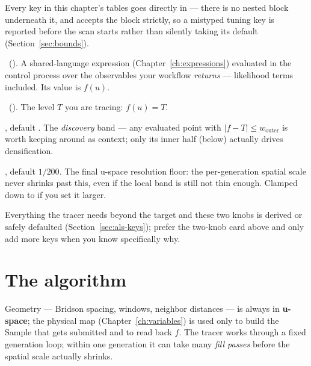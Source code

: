 Every key in this chapter's tables goes directly in  --- there is no
nested block underneath it, and  accepts the block strictly, so
a mistyped tuning key is reported before the scan starts rather than silently taking its
default (Section~\ref{sec:bounds}).

\begin{keylist}
  \item[target\_expression] \req\ (). A shared-language expression
        (Chapter~\ref{ch:expressions}) evaluated in the control process over the
        observables your workflow \emph{returns} --- likelihood terms included. Its
        value is $f(u)$.
  \item[target\_value] \req\ (). The level $T$ you are tracing:
        $f(u) = T$.
  \item[outer\_half\_width] \opt, default . The \emph{discovery} band ---
        any evaluated point with $\lvert f - T\rvert \le w_{\mathrm{outer}}$ is worth
        keeping around as context; only its inner half (below) actually drives
        densification.
  \item[min\_radius] \opt, default $1/200$. The final u-space resolution floor: the
        per-generation spatial scale never shrinks past this, even if the local band is
        still not thin enough. Clamped down to  if you set it
        larger.
\end{keylist}

Everything the tracer needs beyond the target and these two knobs is derived or safely
defaulted (Section~\ref{sec:als-keys}); prefer the two-knob card above and only add more
keys when you know specifically why.

\section{The algorithm}
\label{sec:als-algorithm}

Geometry --- Bridson spacing, windows, neighbor distances --- is always in
\textbf{u-space}; the physical map (Chapter~\ref{ch:variables}) is used only to build
the Sample that gets submitted and to read back $f$. The tracer works through a fixed
generation loop; within one generation it can take many \emph{fill passes} before the
spatial scale actually shrinks.

